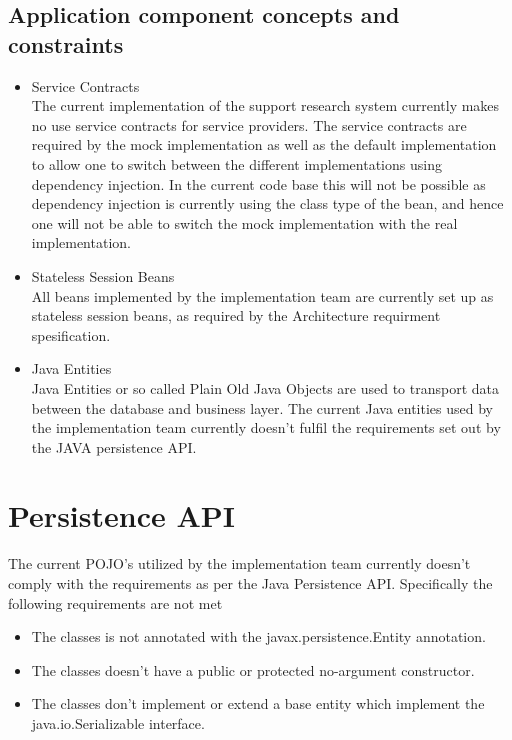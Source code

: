 \documentclass[a4paper,10pt]{article}
\begin{document}
\subsection{Application component concepts and constraints}
\begin{itemize}
	\item Service Contracts\\
	The current implementation of the support research system currently makes no use service contracts for service providers. The service contracts are required by the mock implementation as well as the default implementation to allow one to switch between the different implementations using dependency injection. In the current code base this will not be possible as dependency injection is currently using the class type of the bean, and hence one will not be able to switch the mock implementation with the real implementation.
	
	\item Stateless Session Beans\\
	All beans implemented by the implementation team are currently set up as stateless session beans, as required by the Architecture requirment spesification.
	
	\item Java Entities\\
	Java Entities or so called Plain Old Java Objects are used to transport data between the database and business layer. The current Java entities used by the implementation team currently doesn't fulfil the requirements set out by the  JAVA persistence API.
\end{itemize}

\section{Persistence API}
The current POJO's utilized by the implementation team currently doesn't comply with the requirements as per the Java Persistence API.  Specifically the following requirements are not met
\begin{itemize}
	\item The classes is not annotated with the javax.persistence.Entity annotation.
	\item The classes doesn't have a public or protected no-argument constructor.
	\item The classes don't implement or extend a base entity which implement the java.io.Serializable interface.
\end{itemize}
\end{document}
